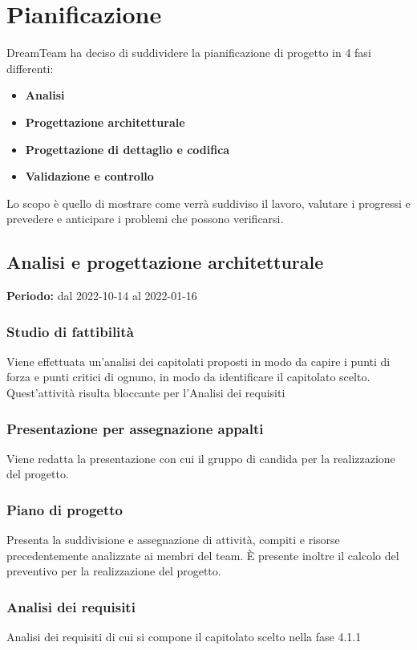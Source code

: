 \section{Pianificazione}
DreamTeam ha deciso di suddividere la pianificazione di progetto in 4 fasi differenti:

\begin{itemize}
\item \textbf{Analisi}
\item \textbf{Progettazione architetturale}
\item \textbf{Progettazione di dettaglio e codifica}
\item	 \textbf{Validazione e controllo}
\end{itemize}

Lo scopo è quello di mostrare come verrà suddiviso il lavoro, valutare i progressi e prevedere e anticipare i problemi che possono verificarsi.

\subsection{Analisi e progettazione architetturale}
\textbf{Periodo:} dal 2022-10-14 al 2022-01-16
\subsubsection{Studio di fattibilità}
Viene effettuata un’analisi dei capitolati proposti in modo da capire i punti di forza e punti critici di ognuno, in modo da identificare il capitolato scelto. Quest’attività risulta bloccante per l’Analisi dei requisiti
\subsubsection{Presentazione per assegnazione appalti}
Viene redatta la presentazione con cui il gruppo di candida per la realizzazione del progetto.
\subsubsection{Piano di progetto}
Presenta la suddivisione e assegnazione di attività, compiti e risorse precedentemente analizzate ai membri del team. È presente inoltre il calcolo del preventivo per la realizzazione del progetto.
\subsubsection{Analisi dei requisiti}
Analisi dei requisiti di cui si compone il capitolato scelto nella fase 4.1.1
